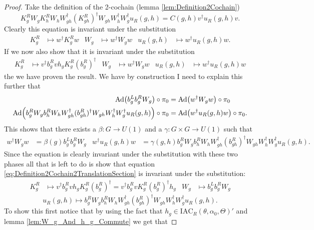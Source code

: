 \documentclass[12pt,a4paper,twoside]{article}
\newcommand{\IAC}{\textrm{IAC}}
\let\originalleft\left
\let\originalright\right
\renewcommand{\left}{\mathopen{}\mathclose\bgroup\originalleft}
\renewcommand{\right}{\aftergroup\egroup\originalright}
\newcommand{\Ad}[1]{\textrm{Ad}\left(#1\right)}
\theoremstyle{definition}
\numberwithin{equation}{section}
\begin{document}
\begin{proof}
	Take the definition of the 2-cochain (lemma \ref{lem:Definition2Cochain})
	\begin{equation}\label{eq:Definition2Cochain2TranslationSection}
		K_g^RW_gK_h^RW_hW_{gh}^\dagger(K_{gh}^R)^\dagger W_{gh}W_{h}^\dagger W_g^\dagger u_R(g,h)=C(g,h)v^\dagger u_R(g,h)v.
	\end{equation}
	Clearly this equation is invariant under the substitution
	\begin{align}
		K_g^R&\mapsto w^\dagger K_g^R w&W_g&\mapsto w^\dagger W_g w&u_R(g,h)&\mapsto w^\dagger u_R(g,h)w.
	\end{align}
	If we now also show that it is invariant under the substitution
	\begin{align}
		K_g^R&\mapsto v^\dagger b_g^R v h_g K_g^R (b_g^R)^\dagger&W_g&\mapsto w^\dagger W_g w&u_R(g,h)&\mapsto w^\dagger u_R(g,h)w
	\end{align}
	the we have proven the result. We have by construction {\color{red}I need to explain this further} that
	\begin{align}
		\Ad{b_g^Lb_g^RW_g}\circ\pi_0&=\Ad{w^\dagger W_g w}\circ\pi_0\\
		\Ad{b_g^R W_g b_h^R W_h W_{gh}^\dagger (b_{gh}^R)^\dagger W_{gh}W_h^\dagger W_g^\dagger u_R(g,h)}\circ\pi_0&=\Ad{w^\dagger u_R(g,h) w}\circ\pi_0.
	\end{align}
	This shows that there exists a $\beta:G\rightarrow U(1)$ and a $\gamma:G\times G\rightarrow U(1)$ such that
	\begin{align}
		w^\dagger W_g w&=\beta(g)b_g^Lb_g^RW_g&w^\dagger u_R(g,h) w&=\gamma(g,h)b_g^R W_g b_h^R W_h W_{gh}^\dagger (b_{gh}^R)^\dagger W_{gh}W_h^\dagger W_g^\dagger u_R(g,h).
	\end{align}
	Since the equation is clearly invariant under the substitution with these two phases all that is left to do is show that equation \eqref{eq:Definition2Cochain2TranslationSection} is invariant under the substitution:
	\begin{align}
		K_g^R&\mapsto v^\dagger b_g^R v h_g K_g^R (b_g^R)^\dagger=v^\dagger b_g^R v K_g^R (b_g^R)^\dagger h_g&W_g&\mapsto b_g^Lb_g^RW_g
	\end{align}
	\begin{equation}
		u_R(g,h)\mapsto b_g^R W_g b_h^R W_h W_{gh}^\dagger (b_{gh}^R)^\dagger W_{gh}W_h^\dagger W_g^\dagger u_R(g,h).
	\end{equation}
	To show this first notice that by using the fact that $h_g\in\IAC_R(\theta,\alpha_0,\Theta)'$ and lemma \ref{lem:W_g_And_h_g_Commute} we get that

\end{proof}
\end{document}
